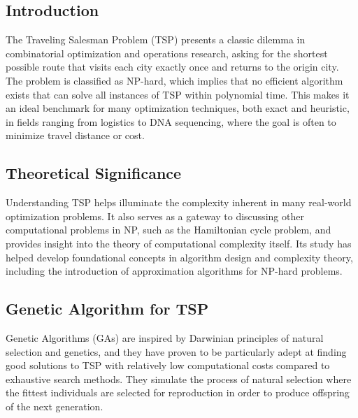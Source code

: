 \documentclass[12pt, a4paper]{article}
\begin{document}
\subsection{Introduction}
The Traveling Salesman Problem (TSP) presents a classic dilemma in combinatorial
optimization and operations research, asking for the shortest possible route
that visits each city exactly once and returns to the origin city. The problem
is classified as NP-hard, which implies that no efficient algorithm exists that
can solve all instances of TSP within polynomial time. This makes it an ideal
benchmark for many optimization techniques, both exact and heuristic, in fields
ranging from logistics to DNA sequencing, where the goal is often to minimize
travel distance or cost.

\subsection{Theoretical Significance}
Understanding TSP helps illuminate the complexity inherent in many real-world
optimization problems. It also serves as a gateway to discussing other
computational problems in NP, such as the Hamiltonian cycle problem, and
provides insight into the theory of computational complexity itself. Its study
has helped develop foundational concepts in algorithm design and complexity
theory, including the introduction of approximation algorithms for NP-hard
problems.

\subsection{Genetic Algorithm for TSP}
Genetic Algorithms (GAs) are inspired by Darwinian principles of natural
selection and genetics, and they have proven to be particularly adept at finding
good solutions to TSP with relatively low computational costs compared to
exhaustive search methods\cite{8862255}. They simulate the process of natural
selection where the fittest individuals are selected for reproduction in order
to produce offspring of the next generation.
\end{document}
